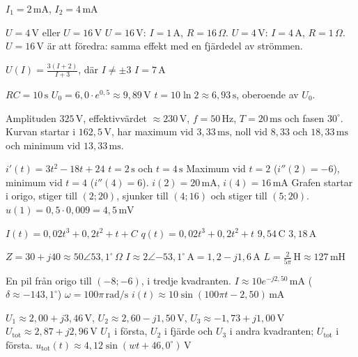 \begin{facit}

 $I_1 = 2\,\text{mA}$, $I_2 = 4\,\text{mA}$

  $U = 4\,\text{V}$ eller $U = 16\,\text{V}$
 $U = 16\,\text{V}$: $I = 1\,\text{A}$, $R = 16\,\Omega$. $U = 4\,\text{V}$: $I = 4\,\text{A}$,
$R = 1\,\Omega$. $U = 16\,\text{V}$ är att föredra: samma effekt med en fjärdedel av strömmen.

  $U(I) = \frac{3(I + 2)}{I + 3}$, där $I \neq \pm 3$  $I = 7\,\text{A}$

  $RC = 10\,\text{s}$  $U_0 = 6{,}0 \cdot e^{0{,}5} \approx 9{,}89\,\text{V}$
 $t = 10 \ln 2 \approx 6{,}93\,\text{s}$, oberoende av $U_0$.

  Amplituden $325\,\text{V}$, effektivvärdet $\approx 230\,\text{V}$, $f = 50\,\text{Hz}$,
$T = 20\,\text{ms}$ och fasen $30^{\circ}$.
 Kurvan startar i $162{,}5\,\text{V}$, har maximum vid $3{,}33\,\text{ms}$, noll vid
$8{,}33$ och $18{,}33\,\text{ms}$ och minimum vid $13{,}33\,\text{ms}$.

  $i'(t) = 3t^2 - 18t + 24$  $t = 2\,\text{s}$ och $t = 4\,\text{s}$
 Maximum vid $t = 2$ ($i''(2) = -6$), minimum vid $t = 4$ ($i''(4) = 6$).
 $i(2) = 20\,\text{mA}$, $i(4) = 16\,\text{mA}$
 Grafen startar i origo, stiger till $(2; 20)$, sjunker till $(4; 16)$ och stiger till
$(5; 20)$.
 $u(1) = 0{,}5 \cdot 0{,}009 = 4{,}5\,\text{mV}$

  $I(t) = 0{,}02t^3 + 0{,}2t^2 + t + C$
 $q(t) = 0{,}02t^3 + 0{,}2t^2 + t$  $9{,}54\,\text{C}$  $3{,}18\,\text{A}$

  $Z = 30 + j40 \approx 50\angle 53{,}1^{\circ}\,\Omega$
 $I \approx 2\angle{-53{,}1^{\circ}}\,\text{A} = 1{,}2 - j1{,}6\,\text{A}$
 $L = \frac{2}{5\pi}\,\text{H} \approx 127\,\text{mH}$

  En pil från origo till $(-8; -6)$, i tredje kvadranten.
 $I \approx 10e^{-j2{,}50}\,\text{mA}$ ($\delta \approx -143{,}1^{\circ}$)
 $\omega = 100\pi\,\text{rad/s}$  $i(t) \approx 10\sin(100\pi t - 2{,}50)\,\text{mA}$

  $U_1 \approx 2{,}00 + j3{,}46\,\text{V}$, $U_2 \approx 2{,}60 - j1{,}50\,\text{V}$,
$U_3 \approx -1{,}73 + j1{,}00\,\text{V}$
 $U_{\text{tot}} \approx 2{,}87 + j2{,}96\,\text{V}$
 $U_1$ i första, $U_2$ i fjärde och $U_3$ i andra kvadranten; $U_{\text{tot}}$ i första.
 $u_{\text{tot}}(t) \approx 4{,}12\sin(wt + 46{,}0^{\circ})\,\text{V}$

\end{facit}
